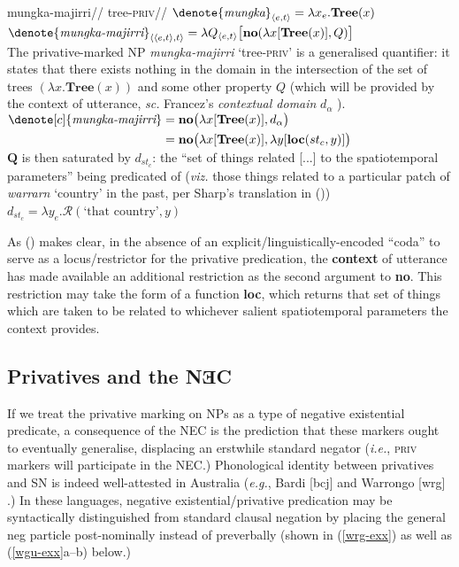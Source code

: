 \pex \a\begingl\gla mungka-majirri//
\glb tree-\textsc{priv}//
\endgl
\a $\denote{\textit{mungka}}_{\langle e,t\rangle} =\lambda x_e.\textbf{Tree}(x) $
\a\label{privsemsF} $\denote{\textit{mungka-majirri}}_{\langle\langle e,t\rangle,t\rangle}=\lambda Q_{\langle e,t\rangle}\big[\textbf{no}(\lambda x[\textbf{Tree}(x)],Q)\big]$\\
The privative-marked NP \textit{mungka-majirri} `tree\textsc{-priv}' is a generalised quantifier: it states that there exists nothing in the domain in the intersection of the set of trees $(\lambda x.\textbf{Tree}(x))$ and some other property $ Q $ (which will be provided by the context of utterance, \textit{sc.} Francez's \textit{contextual domain} $d_\alpha$ \citeyearpar[71]{Francez2007}).
\a$\begin{aligned}\denote[c]{\textit{mungka-majirri}}&=\textbf{no}\big(\lambda x[\textbf{Tree}(x)],d_\alpha\big)\\
&=\textbf{no}\big(\lambda x[\textbf{Tree}(x)],\lambda y[\textbf{loc}(st_c,y)]\big)\\\end{aligned}$\\
$ \boldsymbol Q $ is then saturated by $ d_{st_c} $: the ``set of things related [...] to the spatiotemporal parameters'' being predicated of (\textit{viz.} those things related to a particular patch of \textit{warrarn} `country' in the past, per Sharp's translation in ())\hfill $ d_{st_{c}}=\lambda y_e.\mathcal R(\text{`that country'},y)$

\xe

As () makes clear, in the absence of an explicit/linguistically-encoded ``coda'' to serve as a locus/restrictor for the privative predication, the \textbf{context} of utterance has made available an additional restriction as the second argument to \textbf{no}. This restriction may take the form of a function \textbf{loc}, which returns that set of things which are taken to be related to whichever salient spatiotemporal parameters the context provides.


\subsection{Privatives and the NƎC}

If we treat the privative marking on NPs as a type of negative existential predicate, a consequence of the NEC is the prediction that these markers ought to eventually generalise, displacing an erstwhile standard negator (\textit{i.e.}, \textsc{priv}  markers will participate in the NEC.) Phonological identity between privatives and SN is indeed well-attested in Australia (\textit{e.g.}, Bardi [\gls{bcj}] \citep{Bowern2012} and Warrongo [\gls{wrg}] \citep{Tsunoda2011}.) In these languages, negative existential/privative predication may be syntactically distinguished from standard clausal negation by placing the general \gls{neg} particle post-nominally instead of preverbally (shown in (\ref{wrg-exx}) as well as (\ref{wgu-exx}a--b) below.)

